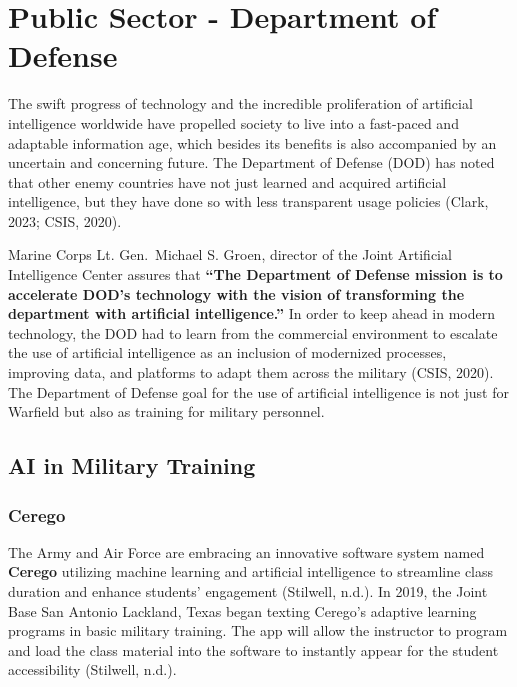 \documentclass[
]{article}
\begin{document}
\hypertarget{public-sector---department-of-defense}{%
\section{Public Sector - Department of Defense}\label{public-sector---department-of-defense}}

The swift progress of technology and the incredible proliferation of artificial intelligence worldwide have propelled society to live into a fast-paced and adaptable information age, which besides its benefits is also accompanied by an uncertain and concerning future. The Department of Defense (DOD) has noted that other enemy countries have not just learned and acquired artificial intelligence, but they have done so with less transparent usage policies (Clark, 2023; CSIS, 2020).

Marine Corps Lt. Gen.~Michael S. Groen, director of the Joint Artificial Intelligence Center assures that \textbf{``The Department of Defense mission is to accelerate DOD's technology with the vision of transforming the department with artificial intelligence.''} In order to keep ahead in modern technology, the DOD had to learn from the commercial environment to escalate the use of artificial intelligence as an inclusion of modernized processes, improving data, and platforms to adapt them across the military (CSIS, 2020). The Department of Defense goal for the use of artificial intelligence is not just for Warfield but also as training for military personnel.

\hypertarget{ai-in-military-training}{%
\subsection{AI in Military Training}\label{ai-in-military-training}}

\hypertarget{cerego}{%
\subsubsection{Cerego}\label{cerego}}

The Army and Air Force are embracing an innovative software system named \textbf{Cerego} utilizing machine learning and artificial intelligence to streamline class duration and enhance students' engagement (Stilwell, n.d.). In 2019, the Joint Base San Antonio Lackland, Texas began texting Cerego's adaptive learning programs in basic military training. The app will allow the instructor to program and load the class material into the software to instantly appear for the student accessibility (Stilwell, n.d.).
\end{document}
